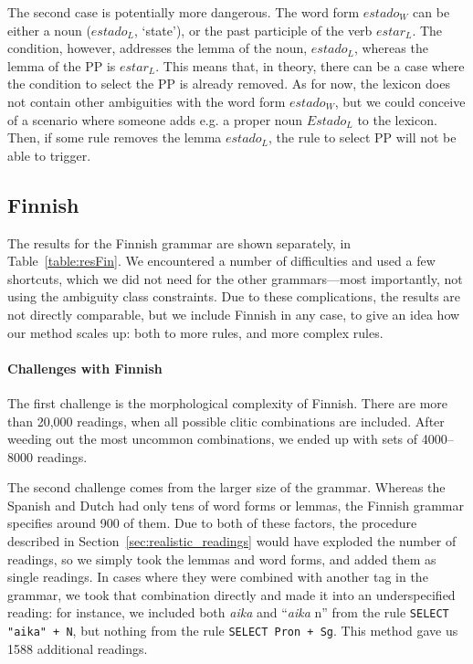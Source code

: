 {{The second case is potentially more dangerous. 
The word form $estado_{W}$ 
can be either a noun ($estado_{L}$, `state'), or the past participle
of the verb $estar_{L}$.  The condition, however, addresses the lemma
of the noun, $estado_L$, whereas the lemma of the PP is $estar_{L}$. 
This means that, in theory, there can be a case where the condition to
select the PP is already removed. As for now, the lexicon does not
contain other ambiguities with the word form $estado_{W}$, but we
could conceive of a scenario where someone adds e.g. a proper noun
$Estado_{L}$ to the lexicon. Then, if some rule removes the lemma
$estado_{L}$, the rule to select PP will not be able to trigger. 





\subsection{Finnish} 
\label{sec:finnishEval}

The results for the Finnish grammar are shown separately, in Table~\ref{table:resFin}. We encountered a number of difficulties and used a few shortcuts, which we did not need for the other grammars---most importantly, not using the ambiguity class constraints. Due to these complications, the results are not directly comparable, but we include Finnish in any case, 
to give an idea how our method scales up: both to more rules, and more complex rules.

\paragraph{Challenges with Finnish} The first challenge is the morphological complexity of Finnish.
There are more than 20,000 readings, when all possible clitic combinations are included.
After weeding out the most uncommon combinations, we ended up with sets of 4000--8000 readings.

The second challenge comes from the larger size of the grammar. Whereas the Spanish and Dutch had only tens of word forms or lemmas, the Finnish grammar specifies around 900 of them.
Due to both of these factors, the procedure described in Section~\ref{sec:realistic_readings} would have exploded the number of readings, so we simply took the lemmas and word forms, and added them as single readings. 
In cases where they were combined with another tag in the grammar, we took that combination directly and made it into an underspecified reading: for instance, we included both \emph{aika} and ``\emph{aika} n'' from the rule \texttt{SELECT "aika" + N},
but nothing from the rule \texttt{SELECT Pron + Sg}. This method gave us 1588 additional readings.

}}
